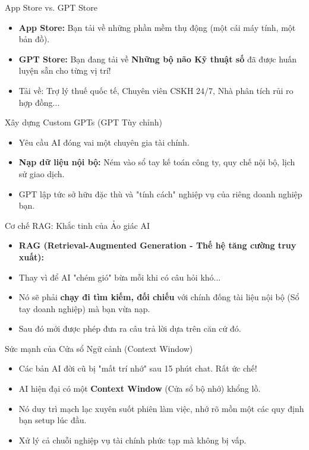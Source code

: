 \documentclass[aspectratio=169,12pt]{beamer}
\begin{document}
\begin{frame}{App Store vs. GPT Store}
    \begin{itemize}
        \item \textbf{App Store:} Bạn tải về những phần mềm thụ động (một cái máy tính, một bản đồ).
        \item \textbf{GPT Store:} Bạn đang tải về \textbf{Những bộ não Kỹ thuật số} đã được huấn luyện sẵn cho từng vị trí!
        \item Tải về: Trợ lý thuế quốc tế, Chuyên viên CSKH 24/7, Nhà phân tích rủi ro hợp đồng...
    \end{itemize}
\end{frame}

\begin{frame}{Xây dựng Custom GPTs (GPT Tùy chỉnh)}
    \begin{itemize}
        \item Yêu cầu AI đóng vai một chuyên gia tài chính.
        \item \textbf{Nạp dữ liệu nội bộ:} Ném vào sổ tay kế toán công ty, quy chế nội bộ, lịch sử giao dịch.
        \item GPT lập tức sở hữu đặc thù và "tính cách" nghiệp vụ của riêng doanh nghiệp bạn.
    \end{itemize}
\end{frame}

\begin{frame}{Cơ chế RAG: Khắc tinh của Ảo giác AI}
    \begin{itemize}
        \item \textbf{RAG (Retrieval-Augmented Generation - Thế hệ tăng cường truy xuất):}
        \item Thay vì để AI "chém gió" bừa mỗi khi có câu hỏi khó...
        \item Nó sẽ phải \textbf{chạy đi tìm kiếm, đối chiếu} với chính đống tài liệu nội bộ (Sổ tay doanh nghiệp) mà bạn vừa nạp.
        \item Sau đó mới được phép đưa ra câu trả lời dựa trên căn cứ đó.
    \end{itemize}
\end{frame}

\begin{frame}{Sức mạnh của Cửa sổ Ngữ cảnh (Context Window)}
    \begin{itemize}
        \item Các bản AI đời cũ bị "mất trí nhớ" sau 15 phút chat. Rất ức chế!
        \item AI hiện đại có một \textbf{Context Window} (Cửa sổ bộ nhớ) khổng lồ.
        \item Nó duy trì mạch lạc xuyên suốt phiên làm việc, nhớ rõ mồn một các quy định bạn setup lúc đầu.
        \item Xử lý cả chuỗi nghiệp vụ tài chính phức tạp mà không bị vấp.
    \end{itemize}
\end{frame}
\end{document}
